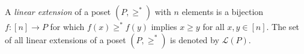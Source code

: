 \documentclass[12pt]{amsart}
\DeclareMathOperator{\ind}{ind}
\DeclareMathOperator{\leftof}{left}
\DeclareMathOperator{\upof}{up}
\newcommand{\met}[1]{\langle #1\rangle}
\theoremstyle{definition}
\newtheorem{definition}[theorem]{Definition}
\begin{document}
A \textit{linear extension} of a poset $(P,\ge^*)$ with $n$ elements is a bijection $f:[n]\to P$ for which $f(x)\ge^* f(y)$ implies $x\ge y$ for all $x,y\in[n]$. The set of all linear extensions of a poset $(P, \ge^*)$ is denoted by $\mathcal{L}(P)$.

\end{document}
